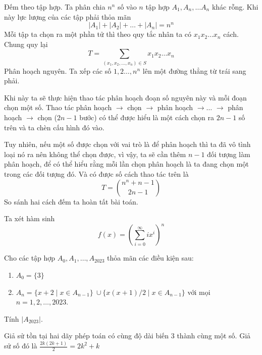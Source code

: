 \documentclass[11pt]{scrartcl}
\begin{document}
\begin{itemize}[label=, leftmargin=0em, itemsep=0.5em]
    \begin{sol}


        Đếm theo tập hợp. Ta phân chia $n^n$ số vào $n$ tập hợp $A_1, A_n,\dots A_n$ khác rỗng. Khi này lực lượng của các tập phải thỏa mãn
        \[
            |A_1| + |A_2| + \dots + |A_n| = n^n
        \]
        Mỗi tập ta chọn ra một phần tử thì theo quy tắc nhân ta có $x_1x_2\dots x_n$ cách. Chung quy lại
        \[
            T=\sum_{(x_1,x_2,\dots,x_n) \in S}x_1x_2\dots x_n 
        \]
         Phân hoạch nguyên. Ta xếp các số $1,2\dots,n^n$ lên một đường thẳng từ trái sang phải. 


        Khi này ta sẽ thực hiện thao tác phân hoạch đoạn số nguyên này và mỗi đoạn chọn một số. Thao tác phân hoạch $\to$ chọn $\to$ phân hoạch $\to \dots$ $\to$ phân hoạch $\to$ chọn ($2n - 1$ bước) có thể được hiểu là một cách chọn ra $2n - 1$ số trên và ta chèn cấu hình đó vào. 
        
        
        Tuy nhiên, nếu một số được chọn với vai trò là để phân hoạch thì ta đã vô tình loại nó ra nên không thể chọn được, vì vậy, ta sẽ cần thêm $n - 1$ đối tượng làm phân hoạch, để có thể hiểu rằng mỗi lần chọn phân hoạch là ta đang chọn một trong các đối tượng đó. Và có được số cách thao tác trên là
        \[
            T = \binom{n^n + n - 1 }{2n - 1}
        \]
        So sánh hai cách đếm ta hoàn tất bài toán.




        Ta xét hàm sinh
        \[
            f(x) = \left(\sum_{i = 0}^{\infty}ix^i\right)^n
        \]
    \end{sol}
    \begin{bt}
        Cho các tập hợp $A_0, A_1, \dots, A_{2023}$ thỏa mãn các điều kiện sau:
        \begin{enumerate}
            \item $A_0 = \{ 3 \}$
            \item $A_n = \{ x + 2 \mid x \in A_{n -     1} \} \ \cup \{x(x+1) / 2 \mid x \in A_{n - 1} \}$ với mọi $n = 1, 2, \dots, 2023$.
        \end{enumerate}
    Tính $|A_{2023}|$.  
    \end{bt}

    \begin{sol}
        Giả sử tồn tại hai dãy phép toán có cùng độ dài biến $3$ thành cùng một số. Giả sử số đó là $\frac{2k(2k + 1)}{2} = 2k^2 + k$



\end{sol}
\end{itemize}
\end{document}
